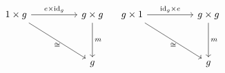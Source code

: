 \begin{figure}[H]
\centering

\[ \begin{array}{cc}
\begin{tikzcd}[column sep=huge, row sep=huge]
	1 \times g \arrow[r, "e \times \textrm{id}_g"] \arrow[rd, "\cong" below] & g \times g \arrow[d, "m"]\\
	 & g
\end{tikzcd}

&

\begin{tikzcd}[column sep=huge, row sep=huge]
	g \times 1 \arrow[r, "\textrm{id}_g \times e"] \arrow[rd, "\cong" below] & g \times g \arrow[d, "m"]\\
	 & g
\end{tikzcd}
\end{array} \]

\end{figure}